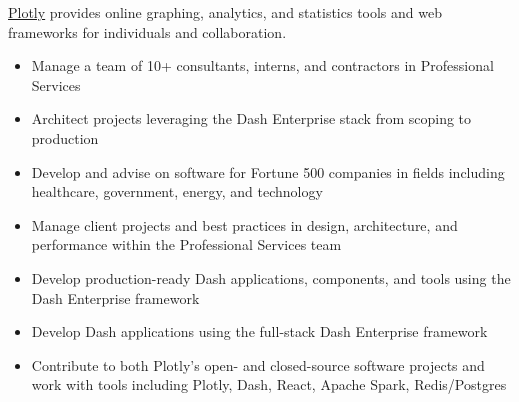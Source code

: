 \documentclass[10pt,ragged2e]{altacv}
\begin{document}
\tagline{}

\begin{fullwidth}
\makecvheader
\end{fullwidth}


\href{https://plotly.com}{Plotly} provides online graphing, analytics, and statistics tools and web frameworks for individuals and collaboration.
\\[8pt]

\begin{itemize}
\item Manage a team of 10+ consultants, interns, and contractors in Professional Services
\item Architect projects leveraging the Dash Enterprise stack from scoping to production
\item Develop and advise on software for Fortune 500 companies in fields including healthcare, government, energy, and technology
\end{itemize}

\divider

\begin{itemize}
\item Manage client projects and best practices in design, architecture, and performance within the Professional Services team
\item Develop production-ready Dash applications, components, and tools using the Dash Enterprise framework
\end{itemize}

\divider

\begin{itemize}
\item Develop Dash applications using the full-stack Dash Enterprise framework
\item Contribute to both Plotly’s open- and closed-source software projects and work with tools including Plotly, Dash, React, Apache Spark, Redis/Postgres
\end{itemize}
\end{document}

